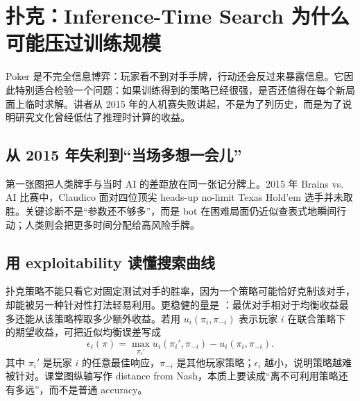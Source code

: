 \section{扑克：Inference-Time Search 为什么可能压过训练规模}

Poker 是不完全信息博弈：玩家看不到对手手牌，行动还会反过来暴露信息。它因此特别适合检验一个问题：如果训练得到的策略已经很强，是否还值得在每个新局面上临时求解。讲者从 2015 年的人机赛失败讲起，不是为了列历史，而是为了说明研究文化曾经低估了推理时计算的收益。

\subsection{从 2015 年失利到“当场多想一会儿”}

第一张图把人类牌手与当时 AI 的差距放在同一张记分牌上。2015 年 Brains vs. AI 比赛中，Claudico 面对四位顶尖 heads-up no-limit Texas Hold'em 选手并未取胜。关键诊断不是“参数还不够多”，而是 bot 在困难局面仍近似查表式地瞬间行动；人类则会把更多时间分配给高风险手牌。



\subsection{用 exploitability 读懂搜索曲线}

扑克策略不能只看它对固定测试对手的胜率，因为一个策略可能恰好克制该对手，却能被另一种针对性打法轻易利用。更稳健的量是 ：最优对手相对于均衡收益最多还能从该策略榨取多少额外收益。若用 $u_i(\pi_i,\pi_{-i})$ 表示玩家 $i$ 在联合策略下的期望收益，可把近似均衡误差写成
\begin{equation}
\epsilon_i(\pi)
= \max_{\pi_i'} u_i(\pi_i',\pi_{-i}) - u_i(\pi_i,\pi_{-i}).
\end{equation}
其中 $\pi_i'$ 是玩家 $i$ 的任意最佳响应，$\pi_{-i}$ 是其他玩家策略；$\epsilon_i$ 越小，说明策略越难被针对。课堂图纵轴写作 distance from Nash，本质上要读成“离不可利用策略还有多远”，而不是普通 accuracy。


